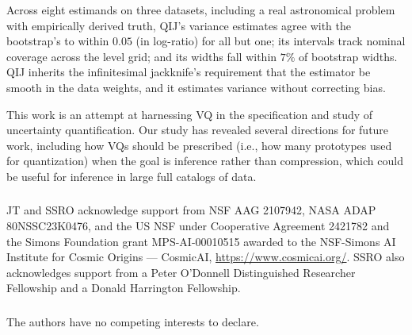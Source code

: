 \documentclass[runningheads]{llncs}
\begin{document}
Across eight estimands on three datasets, including a real astronomical problem with empirically derived truth, QIJ's variance estimates agree with
the bootstrap's to within $0.05$ (in log-ratio) for all but one; its
intervals track nominal coverage across the level grid; and its widths fall
within $7\%$ of bootstrap widths. QIJ inherits the infinitesimal jackknife's requirement that the estimator be smooth in the data weights, and it estimates variance without correcting bias.

This work is an attempt at harnessing VQ in the specification and study of uncertainty quantification. Our study has revealed several directions for future work, including how VQs should be prescribed (i.e., how many prototypes used for quantization) when the goal is inference rather than compression, which could be useful for inference in large full catalogs of data.

\begin{credits}
\subsubsection{\ackname} JT and SSRO acknowledge support from NSF AAG 2107942, NASA ADAP 80NSSC23K0476, and the US NSF under Cooperative Agreement 2421782 and the Simons Foundation grant MPS-AI-00010515 awarded to the NSF-Simons AI Institute for Cosmic Origins --- CosmicAI, \url{https://www.cosmicai.org/}. SSRO also acknowledges support from a Peter O'Donnell Distinguished Researcher Fellowship and a Donald Harrington Fellowship.
\subsubsection{\discintname} The authors have no competing interests to declare.
\end{credits}



\end{document}
